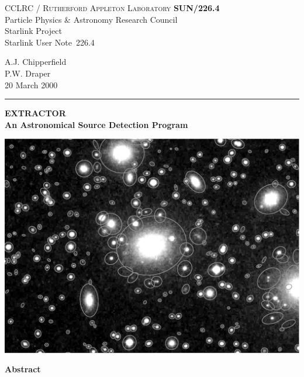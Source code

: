 \documentclass[twoside,11pt]{article}
\newcommand{\stardoccategory}  {Starlink User Note}
\newcommand{\stardocinitials}  {SUN}
\newcommand{\stardocnumber}    {226.4}
\newcommand{\stardocauthors}   {A.J. Chipperfield\\
                                P.W. Draper}
\newcommand{\stardocdate}      {20 March 2000}
\newcommand{\stardoctitle}     {EXTRACTOR\\
                                An Astronomical Source Detection Program}
\newcommand{\stardocname}{\stardocinitials /\stardocnumber}
\newenvironment{latexonly}{}{}
\renewcommand{\_}{\texttt{\symbol{95}}}
\begin{document}
\thispagestyle{empty}

\begin{latexonly}
   CCLRC / \textsc{Rutherford Appleton Laboratory} \hfill \textbf{\stardocname}\\
   {\large Particle Physics \& Astronomy Research Council}\\
   {\large Starlink Project\\}
   {\large \stardoccategory\ \stardocnumber}
   \begin{flushright}
   \stardocauthors\\
   \stardocdate
   \end{flushright}
   \vspace{-4mm}
   \rule{\textwidth}{0.5mm}
   \vspace{4mm}
   \begin{center}
   {\LARGE\textbf{\stardoctitle} \\ [2.5ex]}
   \vspace{4mm}

   \includegraphics[scale=0.6]{sun226fig.ps}
   \end{center}

   \vspace{5mm}
   \begin{center}
      {\Large\textbf{Abstract}}
   \end{center}
\end{latexonly}
\end{document}
